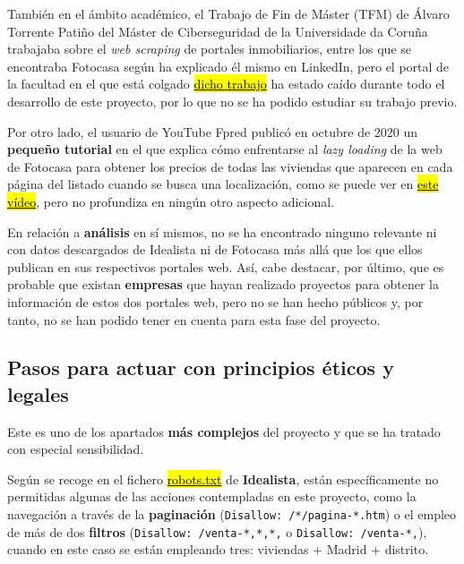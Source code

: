 \documentclass[12pt]{article}
\begin{document}
También en el ámbito académico, el Trabajo de Fin de Máster (TFM) de Álvaro Torrente Patiño del Máster de Ciberseguridad de la Universidade da Coruña trabajaba sobre el \textit{web scraping} de portales inmobiliarios, entre los que se encontraba Fotocasa según ha explicado él mismo en LinkedIn, pero el portal de la facultad en el que está colgado \href{http://castor.det.uvigo.es:8080/xmlui/bitstream/handle/123456789/575/TorrentePatino_Alvaro_TFM_2021.pdf?sequence=1&isAllowed=y}{\hl{dicho trabajo}} ha estado caído durante todo el desarrollo de este proyecto, por lo que no se ha podido estudiar su trabajo previo. 

Por otro lado, el usuario de YouTube Fpred publicó en octubre de 2020 un \textbf{pequeño tutorial} en el que explica cómo enfrentarse al \textit{lazy loading} de la web de Fotocasa para obtener los precios de todas las viviendas que aparecen en cada página del listado cuando se busca una localización, como se puede ver en \href{https://www.youtube.com/watch?v=WMjV7rF3oX8}{\hl{este vídeo}}, pero no profundiza en ningún otro aspecto adicional. 

En relación a \textbf{análisis} en sí mismos, no se ha encontrado ninguno relevante ni con datos descargados de Idealista ni de Fotocasa más allá que los que ellos publican en sus respectivos portales web. Así, cabe destacar, por último, que es probable que existan \textbf{empresas} que hayan realizado proyectos para obtener la información de estos dos portales web, pero no se han hecho públicos y, por tanto, no se han podido tener en cuenta para esta fase del proyecto. 

\vspace{-1.5em}\subsection*{Pasos para actuar con principios éticos y legales}\vspace{-1.0em}

Este es uno de los apartados \textbf{más complejos} del proyecto y que se ha tratado con especial sensibilidad.

Según se recoge en el fichero \href{https://www.idealista.com/robots.txt}{\hl{robots.txt}} de \textbf{Idealista}, están específicamente no permitidas algunas de las acciones contempladas en este proyecto, como la navegación a través de la \textbf{paginación} (\verb|Disallow: /*/pagina-*.htm|) o el empleo de más de dos \textbf{filtros} (\verb|Disallow: /venta-*,*,*,| o \verb|Disallow: /venta-*,|), cuando en este caso se están empleando tres: viviendas + Madrid + distrito. 
\end{document}
